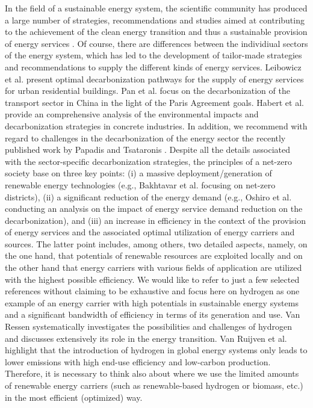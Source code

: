 In the field of a sustainable energy system, the scientific community has produced a large number of strategies, recommendations and studies aimed at contributing to the achievement of the clean energy transition and thus a sustainable provision of energy services \cite{rockstrom2017roadmap}. Of course, there are differences between the individiual sectors of the energy system, which has led to the development of tailor-made strategies and recommendations to supply the different kinds of energy services. Leibowicz et al. \cite{leibowicz2018optimal} present optimal decarbonization pathways for the supply of energy services for urban residential buildings. Pan et al. \cite{pan2018decarbonization} focus on the decarbonization of the transport sector in China in the light of the Paris Agreement goals. Habert et al. \cite{habert2020environmental} provide an comprehensive analysis of the environmental impacts and decarbonization strategies in concrete industries. In addition, we recommend with regard to challenges in the decarbonization of the energy sector the recently published work by Papadis and Tsataronis \cite{papadis2020challenges}. Despite all the details associated with the sector-specific decarbonization strategies, the principles of a net-zero society base on three key points: (i) a massive deployment/generation of renewable energy technologies (e.g., Bakhtavar et al. \cite{bakhtavar2020assessment} focusing on net-zero districts), (ii) a significant reduction of the energy demand (e.g., Oshiro et al. \cite{oshiro2021enabling} conducting an analysis on the impact of energy service demand reduction on the decarbonization), and (iii) an increase in efficiency in the context of the provision of energy services and the associated optimal utilization of energy carriers and sources. The latter point includes, among others, two detailed aspects, namely, on the one hand, that potentials of renewable resources are exploited locally and on the other hand that energy carriers with various fields of application are utilized with the highest possible efficiency. We would like to refer to just a few selected references without claiming to be exhaustive and focus here on hydrogen as one example of an energy carrier with high potentials in sustainable energy systems and a significant bandwidth of efficiency in terms of its generation and use. Van Ressen \cite{van2020hydrogen} systematically investigates the possibilities and challenges of hydrogen and discusses extensively its role in the energy transition. Van Ruijven et al. \cite{van2007potential} highlight that the introduction of hydrogen in global energy systems only leads to lower emissions with high end-use efficiency and low-carbon production. Therefore, it is necessary to think also about where we use the limited amounts of renewable energy carriers (such as renewable-based hydrogen or biomass, etc.) in the most efficient (optimized) way.\newline

